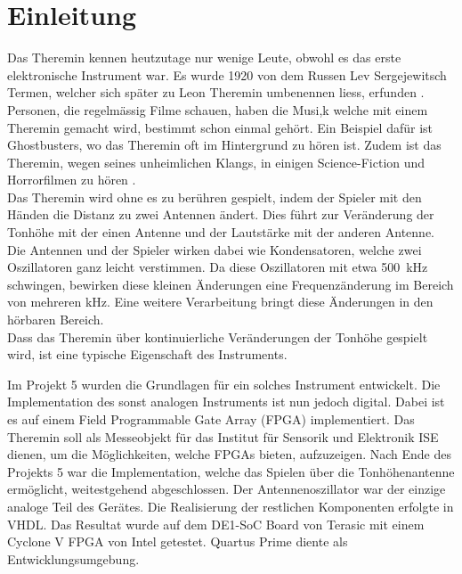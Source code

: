\clearpage
\section{Einleitung}\label{sec:Einleitung}
Das Theremin kennen heutzutage nur wenige Leute, obwohl es das erste elektronische Instrument war. Es wurde 1920 von dem Russen Lev Sergejewitsch Termen, welcher sich später zu Leon Theremin umbenennen liess, erfunden \cite{Theremin_h}. Personen, die regelmässig Filme schauen, haben die Musi,k welche mit einem Theremin gemacht wird, bestimmt schon einmal gehört. Ein Beispiel dafür ist Ghostbusters, wo das Theremin oft im Hintergrund zu hören ist. Zudem ist das Theremin, wegen seines unheimlichen Klangs, in einigen Science-Fiction und Horrorfilmen zu hören \cite{Goast_m}.\\
Das Theremin wird ohne es zu berühren gespielt, indem der Spieler mit den Händen die Distanz zu zwei Antennen ändert. Dies führt zur Veränderung der Tonhöhe mit der einen Antenne und der Lautstärke mit der anderen Antenne. Die Antennen und der Spieler wirken dabei wie Kondensatoren, welche zwei Oszillatoren ganz leicht verstimmen. Da diese Oszillatoren mit etwa \SI{500}{kHz} schwingen, bewirken diese kleinen Änderungen eine Frequenzänderung im Bereich von mehreren kHz. Eine weitere Verarbeitung bringt diese Änderungen in den hörbaren Bereich. \\
Dass das Theremin über kontinuierliche Veränderungen der Tonhöhe gespielt wird, ist eine typische Eigenschaft des Instruments.

Im Projekt 5 wurden die Grundlagen für ein solches Instrument entwickelt. Die Implementation des sonst analogen Instruments ist nun jedoch digital. Dabei ist es auf einem Field Programmable Gate Array (FPGA) implementiert. Das Theremin soll als Messeobjekt für das Institut für Sensorik und Elektronik ISE dienen, um die Möglichkeiten, welche FPGAs bieten, aufzuzeigen. Nach Ende des Projekts 5 war die Implementation, welche das Spielen über die Tonhöhenantenne ermöglicht, weitestgehend abgeschlossen. Der Antennenoszillator war der einzige analoge Teil des Gerätes. Die Realisierung der restlichen Komponenten erfolgte in VHDL. Das Resultat wurde auf dem DE1-SoC Board von Terasic mit einem Cyclone V FPGA von Intel getestet. Quartus Prime diente als Entwicklungsumgebung.

